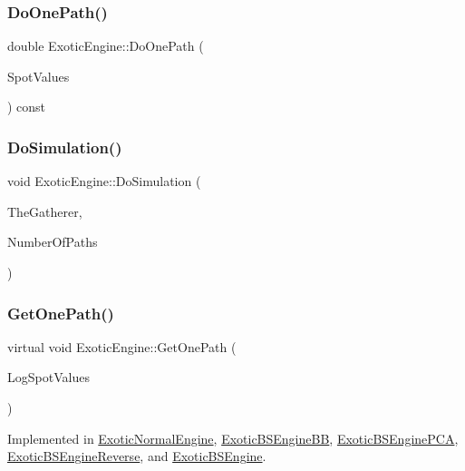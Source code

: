 \subsubsection{\texorpdfstring{Do\+One\+Path()}{DoOnePath()}}
{\footnotesize\ttfamily double Exotic\+Engine\+::\+Do\+One\+Path (\begin{DoxyParamCaption}\item[{const \hyperlink{classMJArray}{M\+J\+Array} \&}]{Spot\+Values }\end{DoxyParamCaption}) const}

\hypertarget{classExoticEngine_a50efae4a77089d6a596153c9c94f1412}{}\label{classExoticEngine_a50efae4a77089d6a596153c9c94f1412} 
\subsubsection{\texorpdfstring{Do\+Simulation()}{DoSimulation()}}
{\footnotesize\ttfamily void Exotic\+Engine\+::\+Do\+Simulation (\begin{DoxyParamCaption}\item[{\hyperlink{classStatisticsMC}{Statistics\+MC} \&}]{The\+Gatherer,  }\item[{unsigned long}]{Number\+Of\+Paths }\end{DoxyParamCaption})}

\hypertarget{classExoticEngine_a1be567d24e89abadb95bb2af7224b54e}{}\label{classExoticEngine_a1be567d24e89abadb95bb2af7224b54e} 
\subsubsection{\texorpdfstring{Get\+One\+Path()}{GetOnePath()}}
{\footnotesize\ttfamily virtual void Exotic\+Engine\+::\+Get\+One\+Path (\begin{DoxyParamCaption}\item[{\hyperlink{classMJArray}{M\+J\+Array} \&}]{Log\+Spot\+Values }\end{DoxyParamCaption})\hspace{0.3cm}{\ttfamily [pure virtual]}}



Implemented in \hyperlink{classExoticNormalEngine_ab86b50858bc7159d23d18b8f692651d5}{Exotic\+Normal\+Engine}, \hyperlink{classExoticBSEngineBB_ad11cfbdc7c2096d8493e0de6eb1eec4b}{Exotic\+B\+S\+Engine\+BB}, \hyperlink{classExoticBSEnginePCA_ad34270f94895d699ff3d3a0ebc020e9f}{Exotic\+B\+S\+Engine\+P\+CA}, \hyperlink{classExoticBSEngineReverse_ad60a172cfb94070d61b07c4140949b74}{Exotic\+B\+S\+Engine\+Reverse}, and \hyperlink{classExoticBSEngine_a4f621796857e8cf1b867d66daea2d690}{Exotic\+B\+S\+Engine}.



